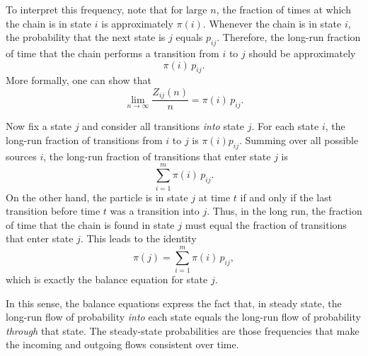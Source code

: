 To interpret this frequency, note that for large \(n\), the fraction of times at which the chain is in state \(i\) is approximately \(\pi(i)\).
Whenever the chain is in state \(i\), the probability that the next state is \(j\) equals \(p_{ij}\).
Therefore, the long-run fraction of time that the chain performs a transition from \(i\) to \(j\) should be approximately
\[
\pi(i) \, p_{ij}.
\]
More formally, one can show that
\[
\lim_{n \to \infty} \frac{Z_{ij}(n)}{n}
=
\pi(i) \, p_{ij}.
\]

Now fix a state \(j\) and consider all transitions \emph{into} state \(j\).
For each state \(i\), the long-run fraction of transitions from \(i\) to \(j\) is \(\pi(i) p_{ij}\).
Summing over all possible sources \(i\), the long-run fraction of transitions that enter state \(j\) is
\[
\sum_{i=1}^{m} \pi(i) \, p_{ij}.
\]
On the other hand, the particle is in state \(j\) at time \(t\) if and only if the last transition before time \(t\) was a transition into \(j\).
Thus, in the long run, the fraction of time that the chain is found in state \(j\) must equal the fraction of transitions that enter state \(j\).
This leads to the identity
\[
\pi(j)
=
\sum_{i=1}^{m} \pi(i) \, p_{ij},
\]
which is exactly the balance equation for state \(j\).

In this sense, the balance equations express the fact that, in steady state, the long-run flow of probability \textit{into} each state equals the long-run flow of probability \textit{through} that state.
The steady-state probabilities are those frequencies that make the incoming and outgoing flows consistent over time.